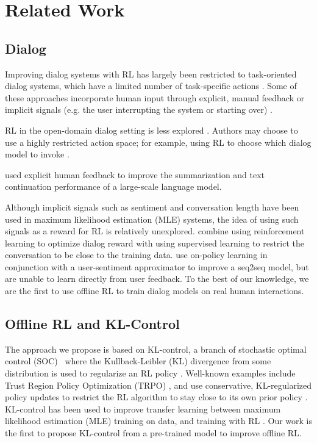 \section{Related Work}
\subsection{Dialog}

Improving dialog systems with RL has largely been restricted to task-oriented dialog systems, which have a limited number of task-specific actions \cite{fatemi2016policy, gavsic2011line, liu2017iterative, liu2018dialogue, su2017sample}. Some of these approaches incorporate human input through explicit, manual feedback \cite{shah2018bootstrapping} or implicit signals (e.g. the user interrupting the system or starting over) \cite{shi2018sentiment}. 

RL in the open-domain dialog setting is less explored  \cite{li2016deep,li2017adversarial,li2018dialogue}. Authors may choose to use a highly restricted action space; for example, using RL to choose which dialog model to invoke \citep{serban2017deep}.

\citet{ziegler2019fine} used explicit human feedback to improve the summarization and text continuation performance of a large-scale language model. 

Although implicit signals such as sentiment \cite{hancock2019learning} and conversation length \cite{zhou2018design} have been used in maximum likelihood estimation (MLE) systems, the idea of using such signals as a reward for RL is relatively unexplored. \citet{henderson2008hybrid} combine using reinforcement learning to optimize dialog reward with using supervised learning to restrict the conversation to be close to the training data. \citet{shin2019happybot} use on-policy learning in conjunction with a user-sentiment approximator to improve a seq2seq model, but are unable to learn directly from user feedback.  To the best of our knowledge, we are the first to use offline RL to train dialog models on real human interactions.

\subsection{Offline RL and KL-Control} The approach we propose is based on KL-control, a branch of stochastic optimal control (SOC)~\cite{stengel1986stochastic} where the Kullback-Leibler (KL) divergence from some distribution is used to regularize an RL policy \cite{abdolmaleki2018maximum, kappen2012optimal,rawlik2012stochastic, todorov2006linearly}. Well-known examples include Trust Region Policy Optimization (TRPO) \cite{slmja-trpo-15}, and use conservative, KL-regularized policy updates to restrict the RL algorithm to stay close to its own prior policy \cite{haarnoja2018soft,kakade2002natural,peters2010relative,rawlik2012stochastic}. KL-control has been used to improve transfer learning between maximum likelihood estimation (MLE) training on data, and training with RL \cite{jaques2017sequence}. Our work is the first to propose KL-control from a pre-trained model to improve offline RL. 


